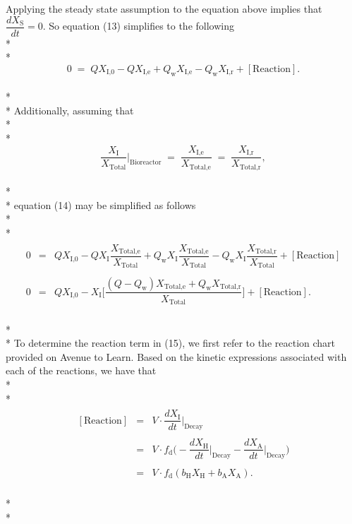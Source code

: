 \documentclass[]{article}
\begin{document}
Applying the steady state assumption to the equation above implies that $\dfrac{dX_{\text{S}}}{dt}=0$. So equation (13) simplifies to the following \\* \\* 
\begin{equation}
0 \; = \; QX_{\text{I,0}} - QX_{\text{I,e}} + Q_{\text{w}}X_{\text{I,e}} - Q_{\text{w}}X_{\text{I,r}} + [\text{Reaction}].
\end{equation} \\* \\*
Additionally, assuming that \\* \\* 
\begin{equation}
\nonumber
\dfrac{X_{\text{I}}}{X_{\text{Total}}}\biggr\rvert_{\text{Bioreactor}} \; = \; \dfrac{X_{\text{I,e}}}{X_{\text{Total,e}}} \; = \; \dfrac{X_{\text{I,r}}}{X_{\text{Total,r}}}, 
\end{equation} \\* \\* 
equation (14) may be simplified as follows \\* \\* 
\begin{align}
\begin{array}{rcl}
0 &=& QX_{\text{I,0}} - QX_{\text{I}}\dfrac{X_{\text{Total,e}}}{X_{\text{Total}}} + Q_{\text{w}}X_{\text{I}}\dfrac{X_{\text{Total,e}}}{X_{\text{Total}}} - Q_{\text{w}}X_{\text{I}}\dfrac{X_{\text{Total,r}}}{X_{\text{Total}}} + [\text{Reaction}] \\ \\
0 &=& QX_{\text{I,0}} - X_{\text{I}} \Bigg[\dfrac{(Q-Q_{\text{w}})X_{\text{Total,e}} + Q_{\text{w}}X_{\text{Total,r}}}{X_{\text{Total}}}\Bigg] + [\text{Reaction}].
\end{array}
\end{align} \\* \\*
To determine the reaction term in (15), we first refer to the reaction chart provided on Avenue to Learn. Based on the kinetic expressions associated with each of the reactions, we have that \\* \\* 
\begin{align}
\begin{array}{rcl}
[\text{Reaction}] &=& V \cdot  \dfrac{dX_{\text{I}}}{dt}\biggr\rvert_{\text{Decay}} \\ \\
&=& V \cdot f_{\text{d}}\Bigg(-\dfrac{dX_{\text{H}}}{dt}\biggr\rvert_{\text{Decay}} - \dfrac{dX_{\text{A}}}{dt}\biggr\rvert_{\text{Decay}}\Bigg) \\ \\
&=& V \cdot f_{\text{d}}(b_{\text{H}}X_{\text{H}}+b_{\text{A}}X_{\text{A}}).
\end{array}
\end{align} \\* \\*
\end{document}
